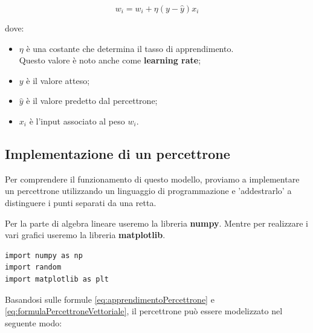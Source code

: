 \begin{equation}
    w_i = w_i + \eta(y - \hat{y}) x_i
    \label{eq:apprendimentoPercettrone}
\end{equation}

dove:
\begin{itemize}
    \item \( \eta \) è una costante che determina il tasso di apprendimento. \\Questo 
    valore è noto anche come \textbf{learning rate};
    \item \( y \) è il valore atteso;
    \item \( \hat{y} \) è il valore predetto dal percettrone;
    \item \( x_i \) è l'input associato al peso \( w_i \).
\end{itemize}

\subsection{Implementazione di un percettrone}
Per comprendere il funzionamento di questo modello, proviamo a implementare un 
percettrone utilizzando un linguaggio di programmazione e 'addestrarlo' a distinguere 
i punti separati da una retta.

\hspace{0.25cm}

Per la parte di algebra lineare useremo la libreria \textbf{numpy}. Mentre per realizzare i
vari grafici useremo la libreria \textbf{matplotlib}.
\begin{lstlisting}
import numpy as np
import random
import matplotlib as plt
\end{lstlisting}

Basandosi sulle formule \eqref{eq:apprendimentoPercettrone} e \eqref{eq:formulaPercettroneVettoriale}, 
il percettrone può essere modelizzato nel seguente modo:

